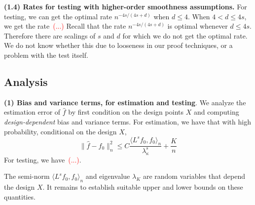 \documentclass{article}
\newcommand{\1}{\mathbf{1}}
\newcommand{\dotp}[2]{\langle #1, #2 \rangle}
\newcommand{\wh}[1]{\widehat{#1}}
\theoremstyle{alden}
\theoremstyle{aldenthm}
\theoremstyle{definition}
\theoremstyle{remark}
\begin{document}
\textbf{(1.4) Rates for testing with higher-order smoothness assumptions.} For testing, we can get the optimal rate $n^{-4s/(4s + d)}$ when $d \leq 4$. When $4 < d \leq 4s$, we get the rate~\textcolor{red}{(...)} Recall that the rate $n^{-4s/(4s + d)}$ is optimal whenever $d \leq 4s$. Therefore there are scalings of $s$ and $d$ for which we do not get the optimal rate. We do not know whether this due to looseness in our proof techniques, or a problem with the test itself.

\subsection{Analysis}
\label{sec:analysis}

\textbf{(1) Bias and variance terms, for estimation and testing}. We analyze the estimation error of $\wh{f}$ by first condition on the design points $X$ and computing \emph{design-dependent} bias and variance terms. For estimation, we have that with high probability, conditional on the design $X$,
\begin{equation*}
\|\wh{f} - f_0\|_n^2 \leq C\frac{\dotp{L^s f_0}{f_0}_n}{\lambda_{\kappa}^s} + \frac{K}{n}
\end{equation*}
For testing, we have~\textcolor{red}{(...)}.

The semi-norm $\dotp{L^s f_0}{f_0}_n$ and eigenvalue $\lambda_{K}$ are random variables that depend the design $X$. It remains to establish suitable upper and lower bounds on these quantities. 
\end{document}
